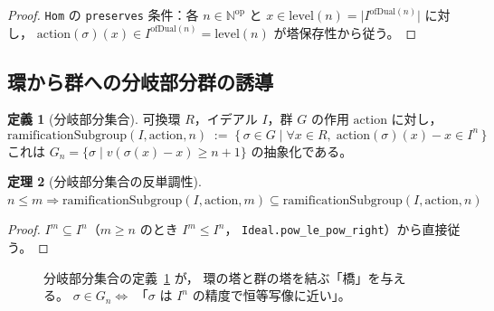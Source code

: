 \documentclass[a4paper,11pt]{ltjsarticle}
\theoremstyle{definition}
\newtheorem{definition}{定義}[section]
\theoremstyle{plain}
\newtheorem{theorem}[definition]{定理}
\theoremstyle{remark}
\begin{document}
\begin{proof}
  \texttt{Hom} の \texttt{preserves} 条件：各 $n \in \mathbb{N}^{\mathrm{op}}$ と
  $x \in \mathrm{level}(n) = \lvert I^{\mathrm{ofDual}(n)}\rvert$ に対し，
  $\mathrm{action}(\sigma)(x) \in I^{\mathrm{ofDual}(n)} = \mathrm{level}(n)$
  が塔保存性から従う。
\end{proof}

\subsection{環から群への分岐部分群の誘導}

\begin{definition}[分岐部分集合]\label{def:ramification-subgroup}
  可換環 $R$，イデアル $I$，群 $G$ の作用 $\mathrm{action}$ に対し，
  \[
    \mathrm{ramificationSubgroup}(I,\mathrm{action},n)
    \;:=\;
    \bigl\{\,\sigma \in G \mid \forall x \in R,\;\mathrm{action}(\sigma)(x) - x \in I^n\,\bigr\}
  \]
  これは $G_n = \{\sigma \mid v(\sigma(x)-x) \geq n+1\}$ の抽象化である。
\end{definition}

\begin{theorem}[分岐部分集合の反単調性]\label{thm:ramification-antitone}
  $n \leq m \Rightarrow
  \mathrm{ramificationSubgroup}(I,\mathrm{action},m)
  \subseteq
  \mathrm{ramificationSubgroup}(I,\mathrm{action},n)$
\end{theorem}

\begin{proof}
  $I^m \subseteq I^n$（$m \geq n$ のとき $I^m \leq I^n$，
  \texttt{Ideal.pow\_le\_pow\_right}）から直接従う。
\end{proof}

\begin{figure}[H]
\centering
{}
\caption{分岐部分集合の定義~\ref{def:ramification-subgroup} が，
環の塔と群の塔を結ぶ「橋」を与える。
$\sigma \in G_n \Leftrightarrow$ 「$\sigma$ は $I^n$ の精度で恒等写像に近い」。}
\label{fig:bridge}
\end{figure}

\end{document}
